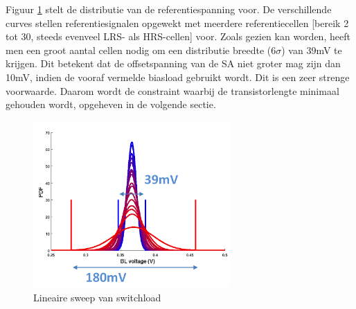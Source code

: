 Figuur \ref{fig:distref} stelt de distributie van de referentiespanning voor. De verschillende curves stellen referentiesignalen opgewekt met meerdere referentiecellen [bereik 2 tot 30, steeds evenveel LRS- als HRS-cellen] voor. Zoals gezien kan worden, heeft men een groot aantal cellen nodig om een distributie breedte (6$\sigma$) van 39mV te krijgen. Dit betekent dat de offsetspanning van de SA niet groter mag zijn dan 10mV, indien de vooraf vermelde biasload gebruikt wordt. Dit is een zeer strenge voorwaarde. Daarom wordt de constraint waarbij de transistorlengte minimaal gehouden wordt, opgeheven in de volgende sectie.

\begin{figure}[!ht]
  \centering
  \includegraphics[width=0.67\textwidth]{../fig/hfdst-last-ref.png}
  \caption{Lineaire sweep van switchload}
  \label{fig:distref}
\end{figure}


